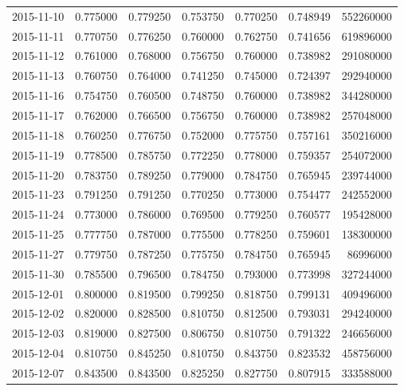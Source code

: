 \begin{tabular}{lrrrrrr}
2015-11-10 &    0.775000 &    0.779250 &    0.753750 &    0.770250 &    0.748949 &   552260000 \\
2015-11-11 &    0.770750 &    0.776250 &    0.760000 &    0.762750 &    0.741656 &   619896000 \\
2015-11-12 &    0.761000 &    0.768000 &    0.756750 &    0.760000 &    0.738982 &   291080000 \\
2015-11-13 &    0.760750 &    0.764000 &    0.741250 &    0.745000 &    0.724397 &   292940000 \\
2015-11-16 &    0.754750 &    0.760500 &    0.748750 &    0.760000 &    0.738982 &   344280000 \\
2015-11-17 &    0.762000 &    0.766500 &    0.756750 &    0.760000 &    0.738982 &   257048000 \\
2015-11-18 &    0.760250 &    0.776750 &    0.752000 &    0.775750 &    0.757161 &   350216000 \\
2015-11-19 &    0.778500 &    0.785750 &    0.772250 &    0.778000 &    0.759357 &   254072000 \\
2015-11-20 &    0.783750 &    0.789250 &    0.779000 &    0.784750 &    0.765945 &   239744000 \\
2015-11-23 &    0.791250 &    0.791250 &    0.770250 &    0.773000 &    0.754477 &   242552000 \\
2015-11-24 &    0.773000 &    0.786000 &    0.769500 &    0.779250 &    0.760577 &   195428000 \\
2015-11-25 &    0.777750 &    0.787000 &    0.775500 &    0.778250 &    0.759601 &   138300000 \\
2015-11-27 &    0.779750 &    0.787250 &    0.775750 &    0.784750 &    0.765945 &    86996000 \\
2015-11-30 &    0.785500 &    0.796500 &    0.784750 &    0.793000 &    0.773998 &   327244000 \\
2015-12-01 &    0.800000 &    0.819500 &    0.799250 &    0.818750 &    0.799131 &   409496000 \\
2015-12-02 &    0.820000 &    0.828500 &    0.810750 &    0.812500 &    0.793031 &   294240000 \\
2015-12-03 &    0.819000 &    0.827500 &    0.806750 &    0.810750 &    0.791322 &   246656000 \\
2015-12-04 &    0.810750 &    0.845250 &    0.810750 &    0.843750 &    0.823532 &   458756000 \\
2015-12-07 &    0.843500 &    0.843500 &    0.825250 &    0.827750 &    0.807915 &   333588000 \\

\end{tabular}
